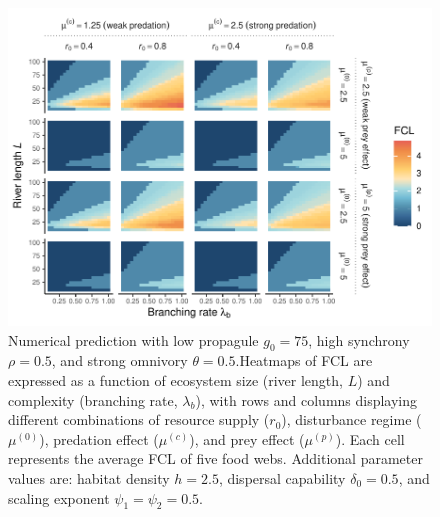 \begin{figure}
\centering
\includegraphics{../data_fmt/fig_rho05_g75_theta05.pdf}
\caption{Numerical prediction with low propagule \(g_0 = 75\), high
synchrony \(\rho = 0.5\), and strong omnivory \(\theta = 0.5\).Heatmaps
of FCL are expressed as a function of ecosystem size (river length,
\(L\)) and complexity (branching rate, \(\lambda_b\)), with rows and
columns displaying different combinations of resource supply (\(r_0\)),
disturbance regime (\(\mu^{(0)}\)), predation effect (\(\mu^{(c)}\)),
and prey effect (\(\mu^{(p)}\)). Each cell represents the average FCL of
five food webs. Additional parameter values are: habitat density
\(h=2.5\), dispersal capability \(\delta_0=0.5\), and scaling exponent
\(\psi_1=\psi_2=0.5\).\label{fig:fig-num7}}
\end{figure}

\newpage

